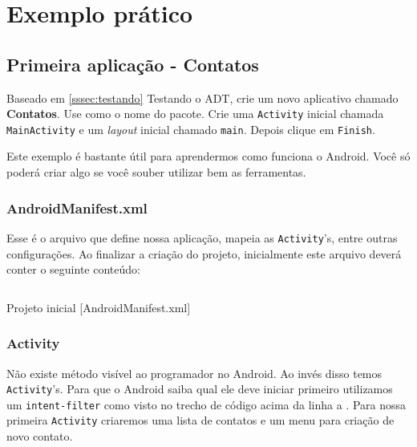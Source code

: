 \chapter{Exemplo prático}

\section{Primeira aplicação - Contatos}

% 
Baseado em \ref{sssec:testando} Testando o ADT, crie um novo aplicativo chamado \textbf{Contatos}. Use
 como o nome do pacote. Crie uma \texttt{Activity} inicial chamada
\texttt{MainActivity} e um \textit{layout} inicial chamado \texttt{main}. Depois clique em
\texttt{Finish}.

Este exemplo é bastante útil para aprendermos como funciona o Android. Você
só poderá criar algo se você souber utilizar bem as ferramentas.

\subsection{AndroidManifest.xml}

Esse é o arquivo que define nossa aplicação, mapeia as \texttt{Activity}'s, entre outras configurações. Ao finalizar
a criação do projeto, inicialmente este arquivo deverá conter o seguinte conteúdo:

\begin{listing}[H]
  \inputminted[linenos=true,frame=bottomline,tabsize=3]{ xml }{ source/AndroidManifest-1.xml }
  \caption{Projeto inicial [AndroidManifest.xml]}
\end{listing}

\subsection{Activity\label{ssec:act}}

Não existe método  visível ao programador no Android. Ao invés disso temos \texttt{Activity}'s.
Para que o Android saiba qual ele deve iniciar primeiro utilizamos um \texttt{intent-filter} como visto
no trecho de código acima da linha  a .
Para nossa primeira \texttt{Activity} criaremos uma lista de contatos e um menu para criação de novo contato.

